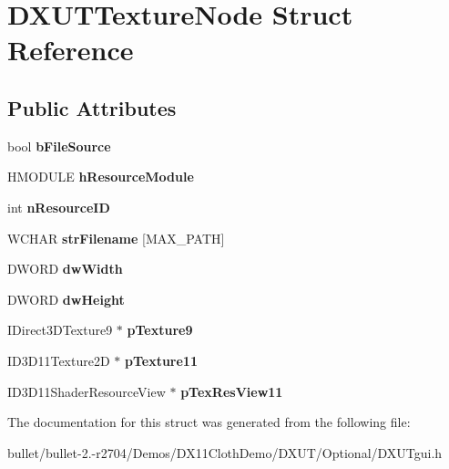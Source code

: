 \hypertarget{struct_d_x_u_t_texture_node}{\section{D\+X\+U\+T\+Texture\+Node Struct Reference}
\label{struct_d_x_u_t_texture_node}
}
\subsection*{Public Attributes}
\begin{DoxyCompactItemize}
\item 
\hypertarget{struct_d_x_u_t_texture_node_a6908a18496ab40bac0b8c6e63b7d28e3}{bool {\bfseries b\+File\+Source}}\label{struct_d_x_u_t_texture_node_a6908a18496ab40bac0b8c6e63b7d28e3}

\item 
\hypertarget{struct_d_x_u_t_texture_node_a4e80e2d2c87816b394ed29294acc7909}{H\+M\+O\+D\+U\+L\+E {\bfseries h\+Resource\+Module}}\label{struct_d_x_u_t_texture_node_a4e80e2d2c87816b394ed29294acc7909}

\item 
\hypertarget{struct_d_x_u_t_texture_node_ae56b4afef5842ee40f2dd4c228b3b71d}{int {\bfseries n\+Resource\+I\+D}}\label{struct_d_x_u_t_texture_node_ae56b4afef5842ee40f2dd4c228b3b71d}

\item 
\hypertarget{struct_d_x_u_t_texture_node_af2e55954d921b023c968ae84e72d907d}{W\+C\+H\+A\+R {\bfseries str\+Filename} \mbox{[}M\+A\+X\+\_\+\+P\+A\+T\+H\mbox{]}}\label{struct_d_x_u_t_texture_node_af2e55954d921b023c968ae84e72d907d}

\item 
\hypertarget{struct_d_x_u_t_texture_node_a29af5db8b2da2c07c6461a2090159463}{D\+W\+O\+R\+D {\bfseries dw\+Width}}\label{struct_d_x_u_t_texture_node_a29af5db8b2da2c07c6461a2090159463}

\item 
\hypertarget{struct_d_x_u_t_texture_node_a25c59cf0fc86a4630fa55f0550339cf6}{D\+W\+O\+R\+D {\bfseries dw\+Height}}\label{struct_d_x_u_t_texture_node_a25c59cf0fc86a4630fa55f0550339cf6}

\item 
\hypertarget{struct_d_x_u_t_texture_node_a070994e588edfdefabff2779ef6bde81}{I\+Direct3\+D\+Texture9 $\ast$ {\bfseries p\+Texture9}}\label{struct_d_x_u_t_texture_node_a070994e588edfdefabff2779ef6bde81}

\item 
\hypertarget{struct_d_x_u_t_texture_node_ac5229bca977bf7240fb7d2f3d84b847b}{I\+D3\+D11\+Texture2\+D $\ast$ {\bfseries p\+Texture11}}\label{struct_d_x_u_t_texture_node_ac5229bca977bf7240fb7d2f3d84b847b}

\item 
\hypertarget{struct_d_x_u_t_texture_node_a9d58596ac68713c7674b7c7863b765a7}{I\+D3\+D11\+Shader\+Resource\+View $\ast$ {\bfseries p\+Tex\+Res\+View11}}\label{struct_d_x_u_t_texture_node_a9d58596ac68713c7674b7c7863b765a7}

\end{DoxyCompactItemize}


The documentation for this struct was generated from the following file\+:\begin{DoxyCompactItemize}
\item 
bullet/bullet-\/2.-\/r2704/\+Demos/\+D\+X11\+Cloth\+Demo/\+D\+X\+U\+T/\+Optional/D\+X\+U\+Tgui.\+h\end{DoxyCompactItemize}
